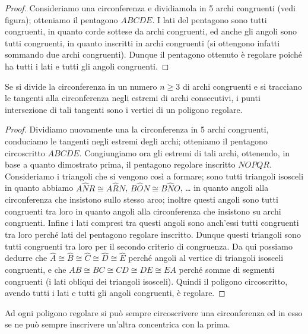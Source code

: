 \begin{proof}
Consideriamo una circonferenza e dividiamola in 5 archi congruenti (vedi figura); otteniamo il pentagono $ABCDE$.
I lati del pentagono sono tutti congruenti, in quanto corde sottese da archi congruenti, ed anche gli angoli sono tutti congruenti, in quanto inscritti in archi congruenti (si ottengono infatti sommando due archi congruenti).
Dunque il pentagono ottenuto è regolare poiché ha tutti i lati e tutti gli angoli congruenti.
\end{proof}

\begin{teorema}
Se si divide la circonferenza in un numero $n\geq 3$ di archi congruenti e si tracciano le tangenti alla circonferenza negli  estremi di archi consecutivi, i punti intersezione di tali tangenti sono i vertici di un poligono regolare.
\end{teorema}

\begin{proof}
Dividiamo nuovamente una la circonferenza in 5 archi congruenti, conduciamo le tangenti negli estremi degli archi; otteniamo il pentagono circoscritto $ABCDE$.
Congiungiamo ora gli estremi di tali archi, ottenendo, in base a quanto dimostrato prima, il pentagono regolare inscritto $NOPQR$. Consideriamo i triangoli che si vengono così a formare; sono tutti triangoli isosceli in quanto abbiamo $A\widehat{N}R\cong A\widehat{R}N$, $B\widehat{O}N\cong B\widehat{N}O$, \ldots{} in quanto angoli alla circonferenza che insistono sullo stesso arco; inoltre questi angoli sono tutti congruenti tra loro in quanto angoli alla circonferenza che insistono su archi congruenti. Infine i lati compresi tra questi angoli sono anch'essi tutti congruenti tra loro perché lati del pentagono regolare inscritto. Dunque questi triangoli sono tutti congruenti tra loro per il secondo criterio di congruenza. Da qui possiamo dedurre che $\widehat{A}\cong \widehat{B}\cong \widehat{C}\cong \widehat{D}\cong \widehat{E}$ perché angoli al vertice di triangoli isosceli congruenti, e che $AB\cong BC\cong CD\cong DE\cong EA$ perché somme di segmenti congruenti (i lati obliqui dei triangoli isosceli). Quindi il poligono circoscritto, avendo tutti i lati e tutti gli angoli congruenti, è regolare.
\end{proof}

\begin{teorema}
Ad ogni poligono regolare si può sempre circoscrivere una circonferenza ed in esso se ne può sempre inscrivere un'altra concentrica con la prima.
\end{teorema}

